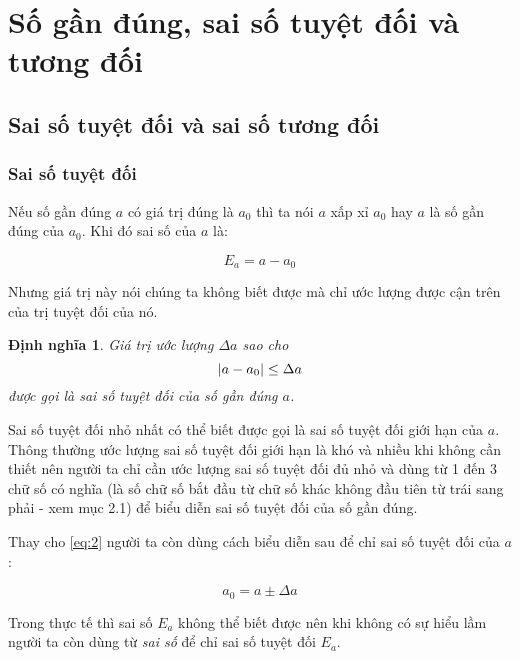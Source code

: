 \documentclass{article}    %
\DeclarePairedDelimiter\abs{\lvert}{\rvert}%
\newtheorem{definition}{Định nghĩa}[section]
\begin{document}
\section{Số gần đúng, sai số tuyệt đối và tương đối}

\subsection{Sai số tuyệt đối và sai số tương đối}

\subsubsection{Sai số tuyệt đối}

Nếu số gần đúng \(a\) có giá trị đúng là \(a_0\) thì ta nói \(a\) xấp xỉ \(a_0\)
hay \(a\) là số gần đúng của \(a_0\). Khi đó sai số của \(a\) là:

\begin{equation} \label{eq:1}
    E_a = a - a_0
\end{equation}

Nhưng giá trị này nói chúng ta không biết được mà chỉ ước lượng được cận trên
của trị tuyệt đối của nó.

\begin{definition}
    Giá trị ước lượng \(\Delta a\) sao cho
    \begin{equation} \label{eq:2}
        \abs{a - a_0} \leq \Delta a
    \end{equation}
    được gọi là \emph{sai số tuyệt đối} của số gần đúng \(a\).
\end{definition}

Sai số tuyệt đối nhỏ nhất có thể biết được gọi là sai số tuyệt đối giới hạn của
\(a\). Thông thường ước lượng sai số tuyệt đối giới hạn là khó và nhiều khi
không cần thiết nên người ta chỉ cần ước lượng sai số tuyệt đối đủ nhỏ và dùng
từ 1 đến 3 chữ số có nghĩa (là số chữ số bắt đầu từ chữ số khác không đầu tiên
từ trái sang phải - xem mục 2.1) để biểu diễn sai số tuyệt đối của số gần đúng.

Thay cho \ref{eq:2} người ta còn dùng cách biểu diễn sau để chỉ sai số tuyệt đối
của \(a\):

\begin{equation} \label{eq:3}
    a_0 = a \pm \Delta a
\end{equation}

Trong thực tế thì sai số \(E_a\) không thể biết được nên khi không có sự hiểu
lầm người ta còn dùng từ \emph{sai số} để chỉ sai số tuyệt đối \(E_a\).
\end{document}
